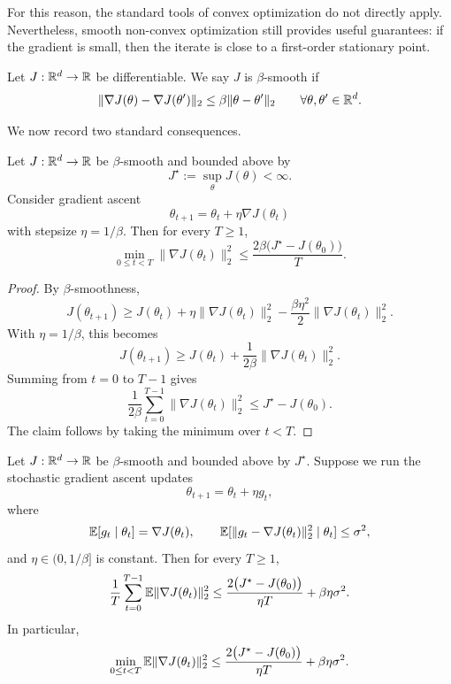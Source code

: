 For this reason, the standard tools of convex optimization do not directly apply.
Nevertheless, smooth non-convex optimization still provides useful guarantees: if the gradient
is small, then the iterate is close to a first-order stationary point.

Let $J:\mathbb{R}^d\to \mathbb{R}$ be differentiable. We say $J$ is $\beta$-smooth if
\begin{equation}\label{eq:def_smoothness}
\|\nabla J(\theta)-\nabla J(\theta')\|_2
\le
\beta \|\theta-\theta'\|_2
\qquad
\forall \theta,\theta'\in\mathbb{R}^d.
\end{equation}

We now record two standard consequences.

\begin{lemma}\label{lemma:stationary}
Let $J:\mathbb{R}^d\to\mathbb{R}$ be $\beta$-smooth and bounded above by
\[
J^\star:=\sup_{\theta} J(\theta)<\infty.
\]
Consider gradient ascent
\[
\theta_{t+1}=\theta_t+\eta \nabla J(\theta_t)
\]
with stepsize $\eta=1/\beta$. Then for every $T\ge 1$,
\[
\min_{0\le t<T}\|\nabla J(\theta_t)\|_2^2
\le
\frac{2\beta\big(J^\star-J(\theta_0)\big)}{T}.
\]
\end{lemma}

\begin{proof}
By $\beta$-smoothness,
\[
J(\theta_{t+1})
\ge
J(\theta_t)
+
\eta \|\nabla J(\theta_t)\|_2^2
-
\frac{\beta\eta^2}{2}\|\nabla J(\theta_t)\|_2^2.
\]
With $\eta=1/\beta$, this becomes
\[
J(\theta_{t+1})
\ge
J(\theta_t)
+
\frac{1}{2\beta}\|\nabla J(\theta_t)\|_2^2.
\]
Summing from $t=0$ to $T-1$ gives
\[
\frac{1}{2\beta}\sum_{t=0}^{T-1}\|\nabla J(\theta_t)\|_2^2
\le
J^\star-J(\theta_0).
\]
The claim follows by taking the minimum over $t<T$.
\end{proof}

\begin{lemma}\label{lemma:sgd_stationary}
Let $J:\mathbb{R}^d\to\mathbb{R}$ be $\beta$-smooth and bounded above by $J^\star$.
Suppose we run the stochastic gradient ascent updates
\[
\theta_{t+1}=\theta_t+\eta g_t,
\]
where
\[
\mathbb{E}[g_t\mid \theta_t]=\nabla J(\theta_t),
\qquad
\mathbb{E}[\|g_t-\nabla J(\theta_t)\|_2^2\mid \theta_t]\le \sigma^2,
\]
and $\eta\in(0,1/\beta]$ is constant.
Then for every $T\ge 1$,
\[
\frac{1}{T}\sum_{t=0}^{T-1}\mathbb{E}\|\nabla J(\theta_t)\|_2^2
\le
\frac{2\big(J^\star-J(\theta_0)\big)}{\eta T}
+
\beta\eta \sigma^2.
\]
In particular,
\[
\min_{0\le t<T}\mathbb{E}\|\nabla J(\theta_t)\|_2^2
\le
\frac{2\big(J^\star-J(\theta_0)\big)}{\eta T}
+
\beta\eta \sigma^2.
\]
\end{lemma}

